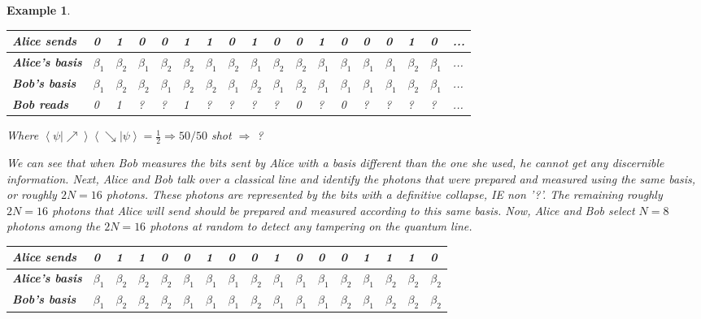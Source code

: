 \documentclass[12pt]{article}
\theoremstyle{plain}
\theoremstyle{nonumberplain}
\theoremstyle{plain}
\newtheorem{example}[lemma]{Example}
\theoremstyle{nonumberplain}
\newcommand\1{{\bf 1}}
\newcommand{\<}{\left\langle}
\renewcommand{\>}{\right\rangle}
\newcommand{\inp}[2]{\left\langle#1\mid #2\right\rangle} %
\begin{document}
\begin{example}
\begin{center}
\begin{table}[h]
\centering
\begin{tabular}{|l|l|l|l|l|l|l|l|l|l|l|l|l|l|l|l|l|l}
\hline
\textbf{Alice sends} & 0 & 1 & 0 & 0 & 1 & 1 & 0 & 1 & 0 & 0 & 1 & 0 & 0 & 0 & 1 & 0 & ... \\ \hline
\textbf{Alice's basis} & $\beta_1$ & $\beta_2$ & $\beta_1$ & $\beta_2$ & $\beta_2$ & $\beta_1$ & $\beta_2$ & $\beta_1$ & $\beta_2$ & $\beta_2$ & $\beta_1$ & $\beta_1$ & $\beta_1$ & $\beta_1$ & $\beta_2$ & $\beta_1$ & ... \\ \hline
\textbf{Bob's basis} & $\beta_1$ & $\beta_2$ & $\beta_2$ & $\beta_1$ & $\beta_2$ & $\beta_2$ & $\beta_1$ & $\beta_2$ & $\beta_1$ & $\beta_2$ & $\beta_1$ & $\beta_1$ & $\beta_1$ & $\beta_1$ & $\beta_2$ & $\beta_1$ & ... \\ \hline
\textbf{Bob reads} & 0 & 1 & ? & ? & 1 & ? & ? & ? & ? & 0 & ? & 0 & ? & ? & ? & ? & ... \\ \hline
\end{tabular}
\end{table}
Where $\inp{\psi}{\nearrow}\inp{\searrow}{\psi}=\frac{1}{2}\Rightarrow 50/50$ shot $\Rightarrow$ ?
\end{center}
We can see that when Bob measures the bits sent by Alice with a basis different than the one she used, he cannot get any discernible information. Next, Alice and Bob talk over a classical line and identify the photons that were prepared and measured using the same basis, or roughly $2N=16$ photons. These photons are represented by the bits with a definitive collapse, IE non '?'. The remaining roughly $2N=16$ photons that Alice will send should be prepared and measured according to this same basis. Now, Alice and Bob select $N=8$ photons among the $2N=16$ photons at random to detect any tampering on the quantum line.
\begin{center}
\begin{table}[h]
\centering
\begin{tabular}{|l|l|l|l|l|l|l|l|l|l|l|l|l|l|l|l|l|}
\hline
\textbf{Alice sends} & 0 & 1 & 1 & 0 & 0 & 1 & 0 & 0 & 1 & 0 & 0 & 0 & 1 & 1 & 1 & 0 \\ \hline
\textbf{Alice's basis} & $\beta_1$ & $\beta_2$ & $\beta_2$ & $\beta_2$ & $\beta_1$ & $\beta_1$ & $\beta_1$ & $\beta_2$ & $\beta_1$ & $\beta_1$ & $\beta_1$ & $\beta_2$ & $\beta_1$ & $\beta_2$ & $\beta_2$ & $\beta_2$ \\ \hline
\textbf{Bob's basis} & $\beta_1$ & $\beta_2$ & $\beta_2$ & $\beta_2$ & $\beta_1$ & $\beta_1$ & $\beta_1$ & $\beta_2$ & $\beta_1$ & $\beta_1$ & $\beta_1$ & $\beta_2$ & $\beta_1$ & $\beta_2$ & $\beta_2$ & $\beta_2$ \\ \hline

\end{tabular}
\end{table}
\end{center}
\end{example}
\end{document}
